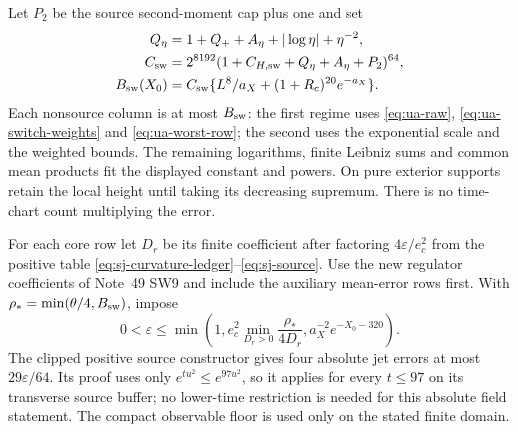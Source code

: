 Let $P_2$ be the source second-moment cap plus one and set
\begin{align}
 Q_\eta&=1+Q_++A_\eta+|\log\eta|+\eta^{-2},\notag\\
 C_{\rm sw}&=2^{8192}(1+C_{H,\rm sw}+Q_\eta+A_\eta+P_2)^{64},\notag\\
 B_{\rm sw}(X_0)&=C_{\rm sw}
       \{L^8/a_X+(1+R_c)^{20}e^{-a_X}\}.
 \label{eq:ua-switch-budget}
\end{align}
Each nonsource column is at most $B_{\rm sw}$: the first regime uses
\eqref{eq:ua-raw}, \eqref{eq:ua-switch-weights} and
\eqref{eq:ua-worst-row}; the second uses the exponential scale and
the weighted bounds. The remaining logarithms, finite Leibniz sums
and common mean products fit the displayed constant and powers.
On pure exterior supports retain the local height until taking its
decreasing supremum. There is no time-chart count multiplying the error.

For each core row let $D_r$ be its finite coefficient after factoring
$4\varepsilon/e_c^2$ from the positive table
\eqref{eq:sj-curvature-ledger}--\eqref{eq:sj-source}. Use the new
regulator coefficients of Note~49 SW9 and include the auxiliary
mean-error rows first. With $\rho_* =\min(\theta/4,B_{\rm sw})$, impose
\begin{equation}
 0<\varepsilon\le
 \min\left(1,e_c^2\min_{D_r>0}\frac{\rho_*}{4D_r},
                    a_X^{-2}e^{-X_0-320}\right).
 \label{eq:ua-source-tolerance}
\end{equation}
The clipped positive source constructor gives four absolute jet errors
at most $29\varepsilon/64$. Its proof uses only $e^{tu^2}\le e^{97u^2}$,
so it applies for every $t\le97$ on its transverse source buffer;
no lower-time restriction is needed for this absolute field statement.
The compact observable floor is used only on the stated finite domain.

